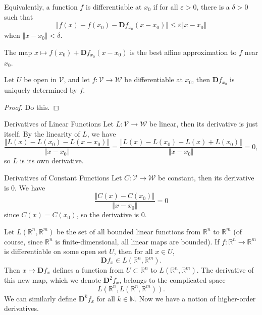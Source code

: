 \documentclass[10pt]{report}
\begin{document}
Equivalently, a function $f$ is differentiable at $x_0$ if for all $\varepsilon>0$, there is a $\delta>0$ such that
\[
	\Vert{f(x)-f(x_0)-\mathbf{D}f_{x_0}(x-x_0)}\Vert \leq \varepsilon\Vert{x-x_0}\Vert
\] when $\Vert{x-x_0}\Vert<\delta$.

\begin{note}{}{}
	The map $x \mapsto f(x_0) + \mathbf{D}f_{x_0}(x-x_0)$ is the best affine approximation to $f$ near $x_0$.
\end{note}

\begin{thrm}{}{}
Let $U$ be open in $\mathcal{V}$, and let $f:\mathcal{V} \to \mathcal{W}$ be differentiable at $x_0$, then $\mathbf{D}f_{x_0}$ is uniquely determined by $f$.
\end{thrm}
\begin{proof}
	{\color{red}Do this.}
\end{proof}

\begin{ex}{Derivatives of Linear Functions}{}
Let $L: \mathcal{V} \to \mathcal{W}$ be linear, then its derivative is just itself. By the linearity of $L$, we have
\[
	\frac{\Vert{L(x)-L(x_0)-L(x-x_0)}\Vert}{\Vert{x-x_0}\Vert} = \frac{\Vert{L(x)-L(x_0)-L(x)+L(x_0)}\Vert}{\Vert{x-x_0}\Vert} = 0,
\] so $L$ is its own derivative.
\end{ex}

\begin{ex}{Derivatives of Constant Functions}{}
Let $C:\mathcal{V}\to\mathcal{W}$ be constant, then its derivative is 0. We have
\[
	\frac{\Vert{C(x)-C(x_0)}\Vert}{\Vert{x-x_0}\Vert} = 0
\] since $C(x)=C(x_0)$, so the derivative is 0.
\end{ex}

Let $L(\mathbb{R}^n, \mathbb{R}^m)$ be the set of all bounded linear functions from $\mathbb{R}^n$ to $\mathbb{R}^m$ (of course, since $\mathbb{R}^n$ is finite-dimensional, all linear maps are bounded). If $f:\mathbb{R}^n \to \mathbb{R}^m$ is differentiable on some open set $U$, then for all $x \in U$,
\[
	\mathbf{D}f_x \in L(\mathbb{R}^n, \mathbb{R}^m).
\] Then $x \mapsto \mathbf{D}f_x$ defines a function from $U \subset \mathbb{R}^n$ to $L(\mathbb{R}^n, \mathbb{R}^m)$. The derivative of this new map, which we denote $\mathbf{D}^2f_x$, belongs to the complicated space
\[
	L(\mathbb{R}^n, L(\mathbb{R}^n, \mathbb{R}^m)).
\] We can similarly define $\mathbf{D}^k f_x$ for all $k \in \mathbb{N}$. Now we have a notion of higher-order derivatives.
\end{document}
